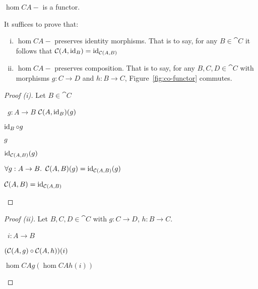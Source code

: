 \begin{prop}
  $\hom{C}{A}{-}$ is a functor.

  It suffices to prove that:
  \begin{enumerate}[(i)]
    \item $\hom{C}{A}{-}$ preserves identity morphisms. That is to say, for any $B\in\cat{C}$ it follows that $\mathcal{C}(A, \operatorname{id}_B) = \operatorname{id}_{\mathcal{C}(A, B)}$
    \item $\hom{C}{A}{-}$ preserves composition. That is to say, for any $B,C,D\in\cat{C}$ with morphisms $g : C \to D$
      and $h : B \to C$, Figure~\ref{fig:co-functor} commutes.
  \end{enumerate}
  \begin{proof}[Proof (i)]
    Let $B\in\cat{C}$
    \begin{itemize}
      \step
        \begin{itemize}
          \subp{\star}
            \Let~$g : A \to B$
            \marginnote{\Hyp}
          \step
            $\mathcal{C}(A, \operatorname{id}_B)(g)$

          \step[=]
            $\operatorname{id}_B\circ g$
            \marginnote{\Def-\ref{def:co-hom}}

          \step[=]
            $g$
            \marginnote{\Def-$\id$}

          \step[=]
            $\operatorname{id}_{\mathcal{C}(A, B)}(g)$
            \marginnote{\Def-$\id$}
        \end{itemize}

      \step[\imps]
        $\forall g : A \to B\ldotp~\mathcal{C}(A, B)(g) = \operatorname{id}_{\mathcal{C}(A, B)}(g)$
        \marginnote{$\forall$-\Intro}

      \step[\iffs]
        $\mathcal{C}(A, B) = \operatorname{id}_{\mathcal{C}(A, B)}$
        \marginnote{\Def-=}
        \qedhere
    \end{itemize}
  \end{proof}

  \begin{proof}[Proof (ii)]
    Let $B, C, D\in\cat{C}$ with ${g : C\to D}$, ${h : B\to C}$.
    \begin{itemize}
      \step
        \begin{itemize}
          \subp{\star} \Let~$i : A\to B$
            \marginnote{\Hyp}

          \step
            $(\mathcal{C}(A, g)\circ\mathcal{C}(A, h))(i)$

          \step[=] $\hom{C}{A}{g}(\hom{C}{A}{h}(i))$
            \marginnote{\Def-$\compose$}


\end{itemize}
\end{itemize}
\end{proof}
\end{prop}
